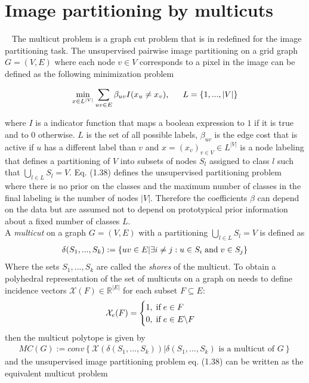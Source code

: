 \section{Image partitioning by multicuts}~\label{sec:multicut}
The multicut problem is a graph cut problem that is in \cite{10.1007/978-3-642-23094-3_3} redefined for the image partitioning task. The unsupervised pairwise image partitioning on a grid graph $G=(V, E)$ where each node $v \in V$ corresponds to a pixel in the image can be defined as the following minimization problem

\begin{align}
	\min_{x \in L^{|V|}} \sum_{uv \in E} \beta_{uv} I(x_u \neq x_v) \text{, \hspace{5mm}} L=\{ 1, ..., |V| \}
\end{align}

where $I$ is a indicator function that maps a boolean expression to $1$ if it is true and to $0$ otherwise. $L$ is the set of all possible labels, $\beta_{uv}$ is the edge cost that is active if $u$ has a different label than $v$ and $x=(x_v)_{v\in V} \in L^{|V|}$ is a node labeling that defines a partitioning of $V$ into subsets of nodes $S_l$ assigned to class $l$ such that $\bigcup_{l \in L} S_l = V$. Eq. (1.38) defines the unsupervised partitioning problem where there is no prior on the classes and the maximum number of classes in the final labeling is the number of nodes $|V|$. Therefore the coefficients $\beta$ can depend on the data but are assumed not to depend on prototypical prior information about a fixed number of classes $L$. \\
A \emph{multicut} on a graph $G=(V,E)$ with a partitioning $\bigcup_{l \in L} S_l = V$ is defined as 
\begin{align}
	\delta(S_1, ..., S_k) := \left\{ uv \in E | \exists i \neq j : u \in S_i \text{\hspace{1mm}and\hspace{1mm}} v \in S_j \right\}
\end{align}
Where the sets $S_1, ..., S_k$ are called the \emph{shores} of the multicut.
To obtain a polyhedral representation of the set of multicuts on a graph on needs to define incidence vectors $\mathcal{X}(F) \in \mathbb{R}^{|E|}$ for each subset $F \subseteq E$:
\begin{align}
	\mathcal{X}_e(F) = \begin{cases}
	1, \text{\hspace{1mm}if\hspace{1mm}} e \in F \\
	0, \text{\hspace{1mm}if\hspace{1mm}} e \in E \backslash F
	\end{cases}
\end{align}
then the multicut polytope is given by
\begin{align}
	MC(G) := conv\left\{ \mathcal{X}(\delta (S_1, ..., S_k)) | \delta (S_1, ..., S_k) \text{ is a multicut of } G \right\}
\end{align}
and the unsupervised image partitioning problem eq. (1.38) can be written as the equivalent multicut problem

